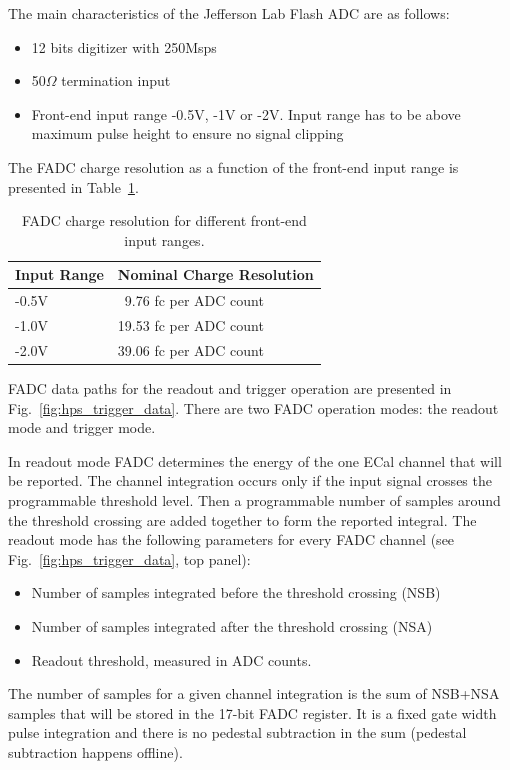 The main characteristics of the Jefferson Lab Flash ADC are as follows:
\begin{itemize}
\item 12 bits digitizer with 250Msps
\item 50$\Omega$ termination input
\item Front-end input range  -0.5V, -1V or -2V.  Input range has to be above maximum pulse height to ensure no signal clipping
\end{itemize}

The FADC charge resolution as a function of the front-end input range is presented in Table~\ref{tab:charge_resolution}.
\begin{table}[h]
\centering
\begin{tabular}{| l | l |}
\hline
Input Range & Nominal Charge Resolution\\\hline
-0.5V & \ 9.76 fc per ADC count \\\hline
-1.0V & 19.53 fc per ADC count \\\hline
-2.0V & 39.06 fc per ADC count \\\hline
\end{tabular}
\caption{FADC charge resolution for different front-end input ranges.}
\label{tab:charge_resolution}
\end{table}

FADC data paths for the readout and trigger operation  are presented in Fig.~\ref{fig:hps_trigger_data}.
There are two FADC operation modes: the readout mode and trigger mode.

 In readout mode FADC determines the energy of the one ECal channel that will be reported. 
The channel integration occurs only if the input signal crosses the programmable threshold level.  Then a programmable number of samples around the threshold crossing are added together to form the reported integral.  The readout  mode has the following parameters for every FADC channel (see Fig.~\ref{fig:hps_trigger_data}, top panel):
 \begin{itemize}
 \item Number of samples integrated before the threshold crossing (NSB)
 \item Number of samples integrated after the  threshold crossing (NSA)
 \item Readout threshold, measured in ADC counts.
 \end{itemize}
 
The number of samples for a given channel integration  is the sum of NSB+NSA samples that will be stored in  
 the 17-bit FADC register. It is a fixed gate width pulse integration and there is no pedestal subtraction in the sum (pedestal subtraction happens offline).
 

